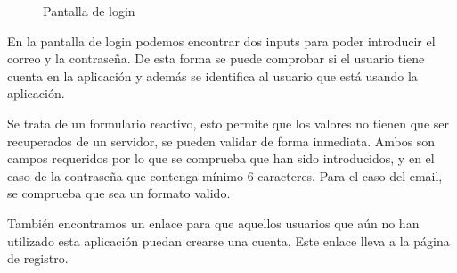 \documentclass[a4paper, 12pt]{book}
\begin{document}
\begin{figure}[H]
 \centering
 \caption{Pantalla de login}
 \label{f:animales}
\end{figure}

En la pantalla de login podemos encontrar dos inputs para poder introducir el correo y la
contrase\~na. De esta forma se puede comprobar si el usuario tiene cuenta en la aplicaci\'on y
adem\'as se identifica al usuario que est\'a usando la aplicaci\'on.

Se trata de un formulario reactivo, esto permite que los valores no tienen que ser recuperados
de un servidor, se pueden validar de forma inmediata. Ambos son campos requeridos por lo que
se comprueba que han sido introducidos, y en el caso de la contrase\~na que contenga m\'inimo 6
caracteres. Para el caso del email, se comprueba que sea un formato valido.

Tambi\'en encontramos un enlace para que aquellos usuarios que a\'un no han utilizado esta
aplicaci\'on puedan crearse una cuenta. Este enlace lleva a la p\'agina de registro.
\end{document}
